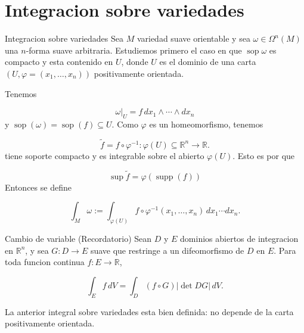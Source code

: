 \section{Integracion sobre variedades}
\begin{bookdefinition}{Integracion sobre variedades}
Sea $M$ variedad suave orientable y sea $\omega\in\Omega^n(M)$ una $n$-forma suave arbitraria. Estudiemos primero el caso en que $\operatorname{sop}\omega$ es compacto y esta contenido en $U$, donde $U$ es el dominio de una carta $(U,\varphi=(x_1,\ldots,x_n))$ positivamente orientada.

Tenemos

\[
\omega|_U=f\,dx_1\wedge\cdots\wedge dx_n
\]
y $\operatorname{sop}(\omega)=\operatorname{sop}(f)\subseteq U$. Como $\varphi$ es un homeomorfismo, tenemos

\[
\widetilde f=f\circ\varphi^{-1}:\varphi(U)\subseteq\mathbb R^n\to\mathbb R.
\]
tiene soporte compacto y es integrable sobre el abierto $\varphi(U)$. Esto es por que

\[
\operatorname{sup}\widetilde{f}=\varphi(\operatorname{supp}(f))
\]
Entonces se define

\[
\int_M\omega:=\int_{\varphi(U)}f\circ\varphi^{-1}(x_1,\ldots,x_n)\,dx_1\cdots dx_n.
\]
\end{bookdefinition}
\label{blk:11f3f1}
\begin{booktheorem}{Cambio de variable (Recordatorio)}
Sean $D$ y $E$ dominios abiertos de integracion en $\mathbb R^n$, y sea $G:D\to E$ suave que restringe a un difeomorfismo de $D$ en $E$. Para toda funcion continua $f:E\to\mathbb R$,

\[
\int_E f\,dV=\int_D(f\circ G)|\det DG|\,dV.
\]
\end{booktheorem}
\label{blk:d9fdaa}
\begin{bookproposition}{}
La anterior integral sobre variedades esta bien definida: no depende de la carta positivamente orientada.

\end{bookproposition}
